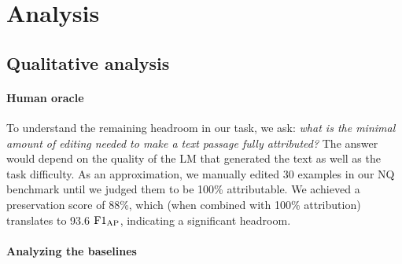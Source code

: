 \documentclass[11pt]{article}
\begin{document}
\section{Analysis}\label{sec:analysis}

\subsection{Qualitative analysis}

\paragraph{Human oracle} To understand the remaining headroom in our task, we ask: \emph{what is the minimal amount of editing needed to make a text passage fully attributed?}
The answer would depend on the quality of the LM that generated the text as well as the task difficulty.
As an approximation, we manually edited 30 examples in our NQ benchmark until we judged them to be 100\% attributable. We achieved a preservation score of 88\%, which (when combined with 100\% attribution) translates to 93.6 $\text{F1}_\text{AP}{}$, indicating a significant headroom.

\paragraph{Analyzing the baselines}
\end{document}
